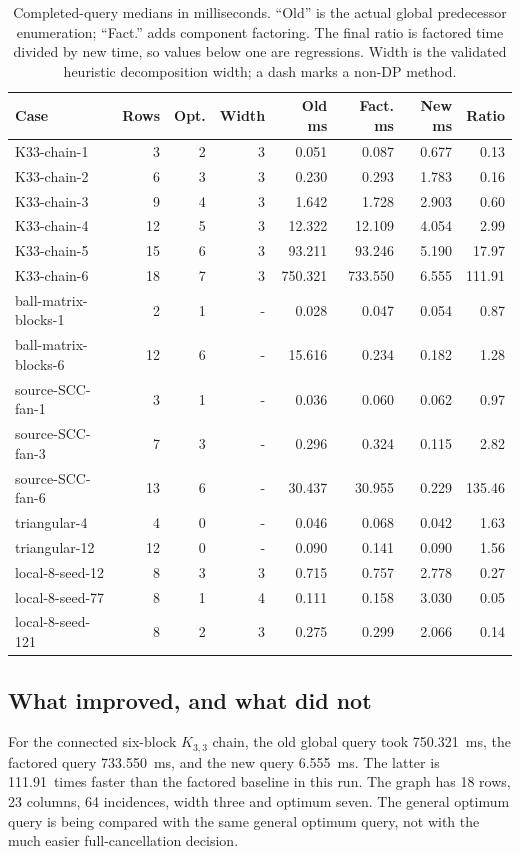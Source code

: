 \documentclass[11pt]{article}
\theoremstyle{definition}\newtheorem{definition}[theorem]{Definition}
\theoremstyle{remark}\newtheorem{remark}[theorem]{Remark}
\newcommand{\ChainOld}{750.321}
\newcommand{\ChainFactored}{733.550}
\newcommand{\ChainNew}{6.555}
\newcommand{\ChainRatio}{111.91}
\begin{document}
\begin{table}[!htbp]
\centering
\small
\begin{tabular}{lrrrrrrr}
\toprule
Case & Rows & Opt. & Width & Old ms & Fact. ms & New ms & Ratio\\
\midrule
K33-chain-1 & 3 & 2 & 3 & 0.051 & 0.087 & 0.677 & 0.13\\
K33-chain-2 & 6 & 3 & 3 & 0.230 & 0.293 & 1.783 & 0.16\\
K33-chain-3 & 9 & 4 & 3 & 1.642 & 1.728 & 2.903 & 0.60\\
K33-chain-4 & 12 & 5 & 3 & 12.322 & 12.109 & 4.054 & 2.99\\
K33-chain-5 & 15 & 6 & 3 & 93.211 & 93.246 & 5.190 & 17.97\\
K33-chain-6 & 18 & 7 & 3 & 750.321 & 733.550 & 6.555 & 111.91\\
ball-matrix-blocks-1 & 2 & 1 & - & 0.028 & 0.047 & 0.054 & 0.87\\
ball-matrix-blocks-6 & 12 & 6 & - & 15.616 & 0.234 & 0.182 & 1.28\\
source-SCC-fan-1 & 3 & 1 & - & 0.036 & 0.060 & 0.062 & 0.97\\
source-SCC-fan-3 & 7 & 3 & - & 0.296 & 0.324 & 0.115 & 2.82\\
source-SCC-fan-6 & 13 & 6 & - & 30.437 & 30.955 & 0.229 & 135.46\\
triangular-4 & 4 & 0 & - & 0.046 & 0.068 & 0.042 & 1.63\\
triangular-12 & 12 & 0 & - & 0.090 & 0.141 & 0.090 & 1.56\\
local-8-seed-12 & 8 & 3 & 3 & 0.715 & 0.757 & 2.778 & 0.27\\
local-8-seed-77 & 8 & 1 & 4 & 0.111 & 0.158 & 3.030 & 0.05\\
local-8-seed-121 & 8 & 2 & 3 & 0.275 & 0.299 & 2.066 & 0.14\\
\bottomrule
\end{tabular}

\caption{Completed-query medians in milliseconds. ``Old'' is the actual global predecessor enumeration; ``Fact.'' adds component factoring. The final ratio is factored time divided by new time, so values below one are regressions. Width is the validated heuristic decomposition width; a dash marks a non-DP method.}
\label{tab:timing}
\end{table}

\subsection{What improved, and what did not}
For the connected six-block $K_{3,3}$ chain, the old global query took \ChainOld\ ms, the factored query \ChainFactored\ ms, and the new query \ChainNew\ ms. The latter is \ChainRatio\ times faster than the factored baseline in this run. The graph has 18 rows, 23 columns, 64 incidences, width three and optimum seven. The general optimum query is being compared with the same general optimum query, not with the much easier full-cancellation decision.
\end{document}
